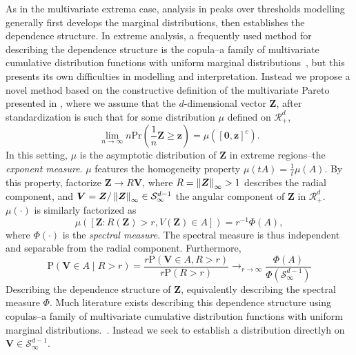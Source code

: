 As in the multivariate extrema case, analysis in peaks over thresholds modelling generally first
  develops the marginal distributions, then establishes the dependence structure.  In extreme analysis,
  a frequently used method for describing the dependence structure is the copula--a family of
  multivariate cumulative distribution functions with uniform marginal distributions~\cite{renard2007,falk2019},
  but this presents its own difficulties in modelling and interpretation.  Instead we propose a novel
  method based on the constructive definition of the multivariate Pareto presented in
  \cite{ferreira2014}, where we assume that the $d$-dimensional vector $\bm{Z}$, after standardization
  is such that for some distribution $\mu$ defined on $\mathcal{R}_+^d$,
  \begin{equation}
    \lim\limits_{n\to\infty}n\text{Pr}\left(\frac{1}{n}\bm{Z}\geq \bm{z}\right) = \mu\left([\bm{0},\bm{z}]^c\right).
  \end{equation}
  In this setting, $\mu$ is the asymptotic distribution of $\bm{Z}$ in extreme regions--the
  \emph{exponent measure}.  $\mu$ features the homogeneity property $\mu(tA) = \frac{1}{t}\mu(A)$.
  By this property, \cite{ferreira2014} factorize $\bm{Z}\to R\bm{V}$, where
  $R = \left\lVert \bm{Z} \right\rVert_{\infty} > 1$ describes the radial component, and
  $\bm{V} = \bm{Z}/\left\lVert \bm{Z} \right\rVert_{\infty} \in \mathcal{S}_{\infty}^{d-1}$ the angular component of
  $\bm{Z}$ in $\mathcal{R}_+^d$.  $\mu(\cdot)$ is similarly factorized as
  \begin{equation}
    \mu\left( [\bm{Z} : R(\bm{Z}) > r, V(\bm{Z}) \in A ] \right) = r^{-1}\Phi(A),
  \end{equation}
  where $\Phi(\cdot)$ is the \emph{spectral measure}.  The spectral measure is thus independent and
  separable from the radial component.  Furthermore,
  \begin{equation}
    \text{P}\left(\bm{V} \in A \mid R > r\right)
      = \frac{r\text{P}\left(\bm{V} \in A, R > r\right)}{r\text{P}(R > r)}
      \longrightarrow_{r\to\infty} \frac{\Phi(A)}{\Phi(\mathcal{S}_{\infty}^{d-1})}
  \end{equation}
  Describing the dependence structure of $\bm{Z}$, equivalently describing the spectral measure
  $\Phi$.  Much literature exists describing this dependence structure using copulas--a family of
  multivariate cumulative distribution functions with uniform marginal distributions.~\cite{renard2007,falk2019}.
  Instead we seek to establish a distribution directlyh on $\bm{V} \in \mathcal{S}_{\infty}^{d-1}$.

